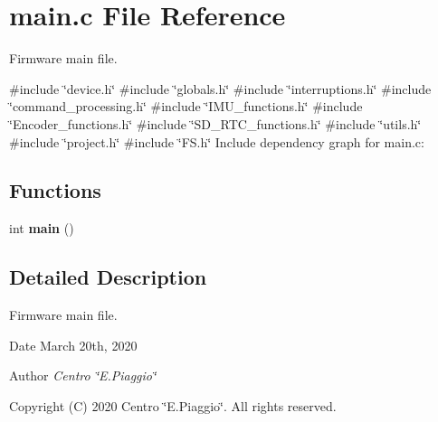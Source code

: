 \section{main.\+c File Reference}
\label{main_8c}


Firmware main file.  


{\ttfamily \#include \char`\"{}device.\+h\char`\"{}}\newline
{\ttfamily \#include \char`\"{}globals.\+h\char`\"{}}\newline
{\ttfamily \#include \char`\"{}interruptions.\+h\char`\"{}}\newline
{\ttfamily \#include \char`\"{}command\+\_\+processing.\+h\char`\"{}}\newline
{\ttfamily \#include \char`\"{}I\+M\+U\+\_\+functions.\+h\char`\"{}}\newline
{\ttfamily \#include \char`\"{}Encoder\+\_\+functions.\+h\char`\"{}}\newline
{\ttfamily \#include \char`\"{}S\+D\+\_\+\+R\+T\+C\+\_\+functions.\+h\char`\"{}}\newline
{\ttfamily \#include \char`\"{}utils.\+h\char`\"{}}\newline
{\ttfamily \#include \char`\"{}project.\+h\char`\"{}}\newline
{\ttfamily \#include \char`\"{}F\+S.\+h\char`\"{}}\newline
Include dependency graph for main.\+c\+:
\subsection*{Functions}
\begin{DoxyCompactItemize}
\item 
\mbox{\label{main_8c_ae66f6b31b5ad750f1fe042a706a4e3d4}} 
int {\bfseries main} ()
\end{DoxyCompactItemize}


\subsection{Detailed Description}
Firmware main file. 

\begin{DoxyDate}{Date}
March 20th, 2020 
\end{DoxyDate}
\begin{DoxyAuthor}{Author}
{\itshape Centro \char`\"{}\+E.\+Piaggio\char`\"{}} 
\end{DoxyAuthor}
\begin{DoxyCopyright}{Copyright}
(C) 2020 Centro \char`\"{}\+E.\+Piaggio\char`\"{}. All rights reserved. 
\end{DoxyCopyright}
